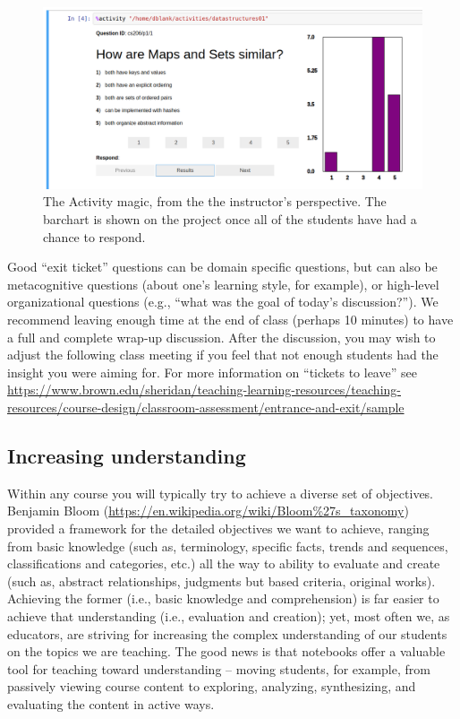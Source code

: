 \documentclass[]{book}
\begin{document}
\begin{figure}
\centering
\includegraphics{images/activity-magic-instructor.png}
\caption{The Activity magic, from the the instructor's perspective. The
barchart is shown on the project once all of the students have had a
chance to respond.}
\end{figure}

Good ``exit ticket'' questions can be domain specific questions, but can
also be metacognitive questions (about one's learning style, for
example), or high-level organizational questions (e.g., ``what was the
goal of today's discussion?''). We recommend leaving enough time at the
end of class (perhaps 10 minutes) to have a full and complete wrap-up
discussion. After the discussion, you may wish to adjust the following
class meeting if you feel that not enough students had the insight you
were aiming for. For more information on ``tickets to leave'' see
\url{https://www.brown.edu/sheridan/teaching-learning-resources/teaching-resources/course-design/classroom-assessment/entrance-and-exit/sample}

\subsection{Increasing understanding}\label{increasing-understanding}

Within any course you will typically try to achieve a diverse set of
objectives. Benjamin Bloom
(\url{https://en.wikipedia.org/wiki/Bloom\%27s_taxonomy}) provided a
framework for the detailed objectives we want to achieve, ranging from
basic knowledge (such as, terminology, specific facts, trends and
sequences, classifications and categories, etc.) all the way to ability
to evaluate and create (such as, abstract relationships, judgments but
based criteria, original works). Achieving the former (i.e., basic
knowledge and comprehension) is far easier to achieve that understanding
(i.e., evaluation and creation); yet, most often we, as educators, are
striving for increasing the complex understanding of our students on the
topics we are teaching. The good news is that notebooks offer a valuable
tool for teaching toward understanding -- moving students, for example,
from passively viewing course content to exploring, analyzing,
synthesizing, and evaluating the content in active ways.
\end{document}
